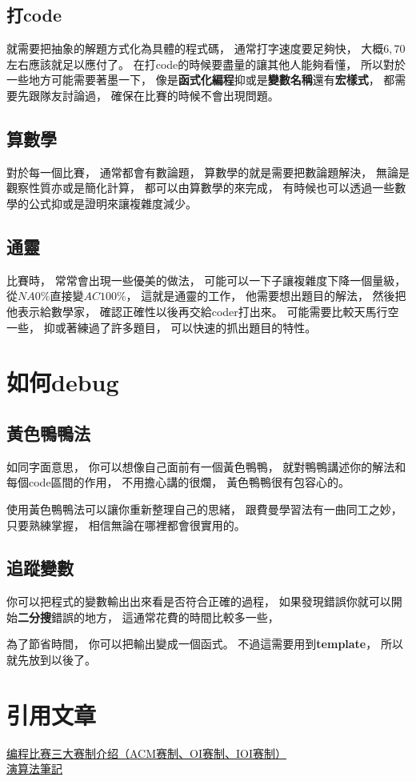 \documentclass[12pt,oneside]{article}
\begin{document}
\subsection{打\textbf{code}}
就需要把抽象的解題方式化為具體的程式碼，
通常打字速度要足夠快，
大概$6, 70$左右應該就足以應付了。
在打code的時候要盡量的讓其他人能夠看懂，
所以對於一些地方可能需要著墨一下，
像是\textbf{函式化編程}抑或是\textbf{變數名稱}還有\textbf{宏樣式}，
都需要先跟隊友討論過，
確保在比賽的時候不會出現問題。

\subsection{算數學}
對於每一個比賽，
通常都會有數論題，
算數學的就是需要把數論題解決，
無論是觀察性質亦或是簡化計算，
都可以由算數學的來完成，
有時候也可以透過一些數學的公式抑或是證明來讓複雜度減少。

\subsection{通靈}
比賽時，
常常會出現一些優美的做法，
可能可以一下子讓複雜度下降一個量級，
從$NA0\%$直接變$AC100\%$，
這就是通靈的工作，
他需要想出題目的解法，
然後把他表示給數學家，
確認正確性以後再交給coder打出來。
可能需要比較天馬行空一些，
抑或著練過了許多題目，
可以快速的抓出題目的特性。

\section{如何debug}
\subsection{黃色鴨鴨法}
如同字面意思，
你可以想像自己面前有一個黃色鴨鴨，
就對鴨鴨講述你的解法和每個code區間的作用，
不用擔心講的很爛，
黃色鴨鴨很有包容心的。

使用黃色鴨鴨法可以讓你重新整理自己的思緒，
跟費曼學習法有一曲同工之妙，
只要熟練掌握，
相信無論在哪裡都會很實用的。

\subsection{追蹤變數}
你可以把程式的變數輸出出來看是否符合正確的過程，
如果發現錯誤你就可以開始\textbf{二分搜}錯誤的地方，
這通常花費的時間比較多一些，

為了節省時間，
你可以把輸出變成一個函式。
不過這需要用到\textbf{template}，
所以就先放到以後了。


\section{引用文章}
\href{https://zhuanlan.zhihu.com/p/129311302}{编程比赛三大赛制介绍（ACM赛制、OI赛制、IOI赛制）}\\
\href{https://web.ntnu.edu.tw/~algo/Activity.html}{演算法筆記}
\end{document}
